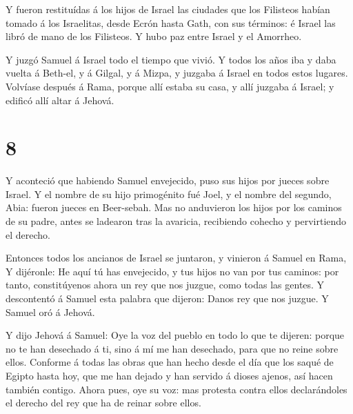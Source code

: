  Y fueron restituídas á los hijos de Israel las ciudades
que los Filisteos habían tomado á los Israelitas, desde Ecrón hasta
Gath, con sus términos: é Israel las libró de mano de los Filisteos. Y
hubo paz entre Israel y el Amorrheo.

 Y juzgó Samuel á Israel todo el tiempo que vivió.
 Y todos los años iba y daba vuelta á Beth-el, y á Gilgal,
y á Mizpa, y juzgaba á Israel en todos estos lugares. 
Volvíase después á Rama, porque allí estaba su casa, y allí juzgaba á
Israel; y edificó allí altar á Jehová.

\hypertarget{section-7}{%
\section{8}\label{section-7}}

 Y aconteció que habiendo Samuel envejecido, puso sus hijos
por jueces sobre Israel.  Y el nombre de su hijo primogénito
fué Joel, y el nombre del segundo, Abia: fueron jueces en Beer-sebah.
 Mas no anduvieron los hijos por los caminos de su padre,
antes se ladearon tras la avaricia, recibiendo cohecho y pervirtiendo el
derecho.

 Entonces todos los ancianos de Israel se juntaron, y
vinieron á Samuel en Rama,  Y dijéronle: He aquí tú has
envejecido, y tus hijos no van por tus caminos: por tanto, constitúyenos
ahora un rey que nos juzgue, como todas las gentes.  Y
descontentó á Samuel esta palabra que dijeron: Danos rey que nos juzgue.
Y Samuel oró á Jehová.

 Y dijo Jehová á Samuel: Oye la voz del pueblo en todo lo
que te dijeren: porque no te han desechado á ti, sino á mí me han
desechado, para que no reine sobre ellos.  Conforme á todas
las obras que han hecho desde el día que los saqué de Egipto hasta hoy,
que me han dejado y han servido á dioses ajenos, así hacen también
contigo.  Ahora pues, oye su voz: mas protesta contra ellos
declarándoles el derecho del rey que ha de reinar sobre ellos.

